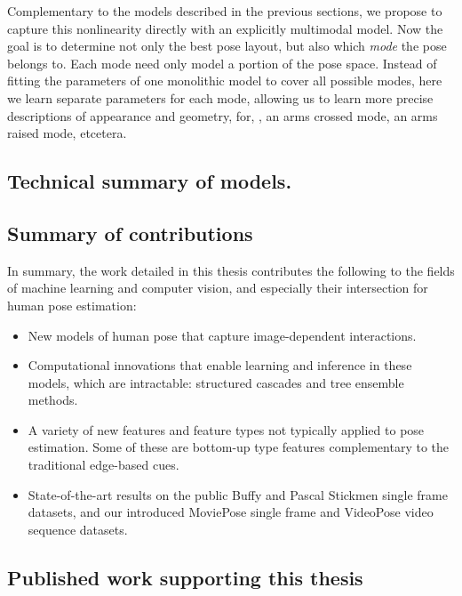 Complementary to the models described in the previous sections, we propose to 
capture this nonlinearity directly with an explicitly multimodal model.  Now 
the goal is to determine not only the best pose layout, but also which {\em 
mode} the pose belongs to.
Each mode need only model a portion of the pose space.  Instead of fitting the 
parameters of one monolithic model to cover all possible modes, here we learn 
separate parameters for each mode, allowing us to learn more precise 
descriptions of appearance and geometry, for, \eg, an arms crossed mode, an 
arms raised mode, etcetera. 

\subsection{Technical summary of models.}



\subsection{Summary of contributions}

In summary, the work detailed in this thesis contributes the following to the 
fields of machine learning and computer vision, and especially their 
intersection for human pose estimation:
\begin{itemize}

\item New models of human pose that capture image-dependent interactions.

\item Computational innovations that enable learning and inference in these 
models, which are \naively intractable: structured cascades and tree ensemble 
methods.

\item A variety of new features and feature types not typically applied to pose 
estimation.  Some of these are bottom-up type features complementary to the 
traditional edge-based cues.

\item State-of-the-art results on the public Buffy and Pascal Stickmen single 
frame datasets, and our introduced MoviePose single frame and VideoPose video 
sequence datasets.

\end{itemize}


\subsection{Published work supporting this thesis}


